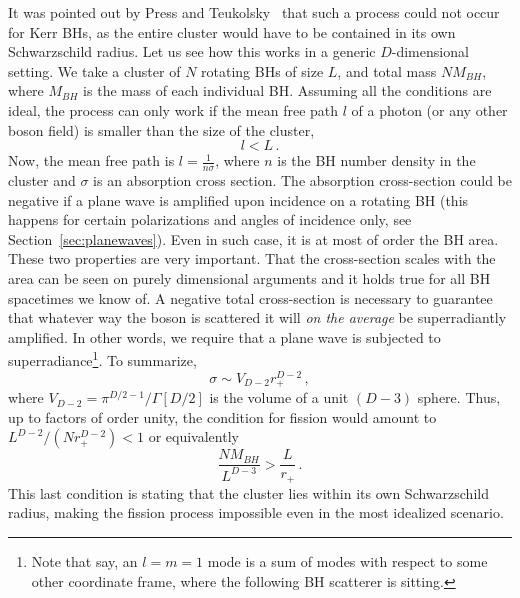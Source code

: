 \documentclass[11pt]{article}
\newcommand{\be}{\begin{equation}}
\newcommand{\ee}{\end{equation}}
\numberwithin{equation}{section} %
\begin{document}
It was pointed out by Press and Teukolsky~\cite{Teukolsky:1974yv} that such a process could not occur for Kerr BHs, as the entire cluster would have to be contained in its own Schwarzschild radius. Let us see how this works in a generic $D$-dimensional setting. We take a cluster of $N$ rotating BHs of size $L$, and total mass $NM_{BH}$, where $M_{BH}$ is the mass of each individual BH. Assuming all the conditions are ideal, the process can only work if the mean free path $l$ of a photon (or any other boson field) is smaller than the size of the cluster,
%
\be
l<L\,.
\ee
%
Now, the mean free path is $l=\frac{1}{n\sigma}$, where $n$ is the BH number density in the cluster and $\sigma$ is an absorption cross section. The absorption cross-section could be negative if a plane wave is amplified upon incidence on a rotating BH (this happens for certain polarizations and angles of incidence only, see Section~\ref{sec:planewaves}).
Even in such case, it is at most of order the BH area. These two properties are very important. That the cross-section scales with the area can be seen on purely dimensional arguments and it holds true for all BH spacetimes we know of. A negative total cross-section is necessary to guarantee that whatever way the boson is scattered it will {\it on the average} be superradiantly amplified. In other words, we require that a plane wave is subjected to superradiance\footnote{Note that say, an $l=m=1$ mode is a sum of modes with respect to some other coordinate frame, where the following BH scatterer is sitting.}.
To summarize,
%
\be
\sigma \sim V_{D-2}r_+^{D-2}\,,
\ee
%
where $V_{D-2}=\pi^{D/2-1}/\Gamma[D/2]$ is the volume of a unit $(D-3)$ sphere. Thus, up to factors of order unity, the condition for fission would amount to $L^{D-2}/(N r_+^{D-2})<1$ or equivalently
%
\be
\frac{NM_{BH}}{L^{D-3}}>\frac{L}{r_+}\,.
\ee
%
This last condition is stating that the cluster lies within its own Schwarzschild radius, making the fission process impossible even in the most idealized scenario.

\end{document}
